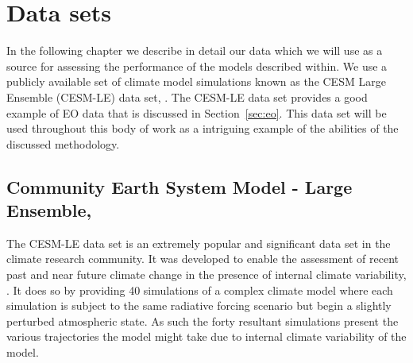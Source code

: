 
\chapter{Data sets\label{cha:data}}  %

\ifpdf
    \graphicspath{{Chapter2/Figs/Raster/}{Chapter2/Figs/PDF/}{Chapter2/Figs/}}
\else
    \graphicspath{{Chapter2/Figs/Vector/}{Chapter2/Figs/}}
\fi

In the following chapter we describe in detail our data which we will use as a source for assessing the performance of the models described within. We use a publicly available set of climate model simulations known as the CESM Large Ensemble (CESM-LE) data set, \citep{kay_community_2015}. The CESM-LE data set provides a good example of EO data that is discussed in Section~\ref{sec:eo}. This data set will be used throughout this body of work as a intriguing example of the abilities of the discussed methodology. 

 \section[CESM-LE]{\label{sec:cesmle}Community Earth System Model - Large Ensemble,  \citep{kay_community_2015}}
 
 The CESM-LE data set is an extremely popular and significant data set in the climate research community. It was developed to enable the assessment of recent past and near future climate change in the presence of internal climate variability, \citep{kay_community_2015}. It does so by providing 40 simulations of a complex climate model where each simulation is subject to the same radiative forcing scenario but begin a slightly perturbed atmospheric state. As such the forty resultant simulations present the various trajectories the model might take due to internal climate variability of the model. 
 
